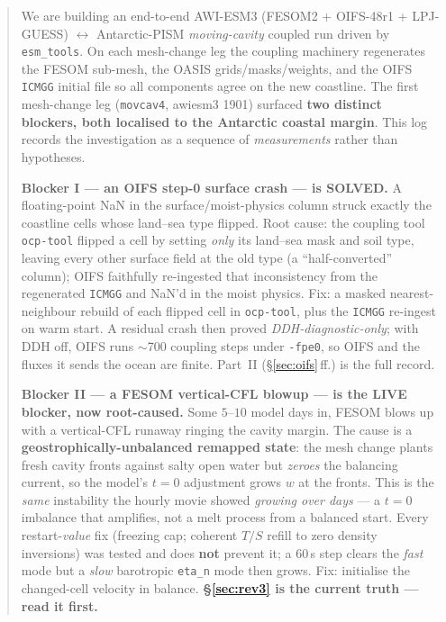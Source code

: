 \documentclass[11pt,a4paper]{article}
\newcommand{\code}[1]{\texttt{\small #1}}
\begin{document}
\begin{abstract}
\noindent
We are building an end-to-end AWI-ESM3 (FESOM2 + OIFS-48r1 + LPJ-GUESS) $\leftrightarrow$
Antarctic-PISM \emph{moving-cavity} coupled run driven by \code{esm\_tools}. On each
mesh-change leg the coupling machinery regenerates the FESOM sub-mesh, the OASIS
grids/masks/weights, and the OIFS \code{ICMGG} initial file so all components agree on the
new coastline. The first mesh-change leg (\code{movcav4}, awiesm3 1901) surfaced \textbf{two
distinct blockers, both localised to the Antarctic coastal margin}. This log records the
investigation as a sequence of \emph{measurements} rather than hypotheses.

\smallskip\noindent
\textbf{Blocker I --- an OIFS step-0 surface crash --- is SOLVED.} A floating-point NaN in
the surface/moist-physics column struck exactly the coastline cells whose land--sea type
flipped. Root cause: the coupling tool \code{ocp-tool} flipped a cell by setting \emph{only}
its land--sea mask and soil type, leaving every other surface field at the old type (a
``half-converted'' column); OIFS faithfully re-ingested that inconsistency from the
regenerated \code{ICMGG} and NaN'd in the moist physics. Fix: a masked nearest-neighbour
rebuild of each flipped cell in \code{ocp-tool}, plus the \code{ICMGG} re-ingest on warm
start. A residual crash then proved \emph{DDH-diagnostic-only}; with DDH off, OIFS runs
$\sim$700 coupling steps under \code{-fpe0}, so OIFS and the fluxes it sends the ocean are
finite. Part~II (\S\ref{sec:oifs}\,ff.) is the full record.

\smallskip\noindent
\textbf{Blocker II --- a FESOM vertical-CFL blowup --- is the LIVE blocker, now root-caused.}
Some $5$--$10$ model days in, FESOM blows up with a vertical-CFL runaway ringing the cavity
margin. The cause is a \textbf{geostrophically-unbalanced remapped state}: the mesh change plants
fresh cavity fronts against salty open water but \emph{zeroes} the balancing current, so the
model's $t=0$ adjustment grows $w$ at the fronts. This is the \emph{same} instability the hourly
movie showed \emph{growing over days} --- a $t=0$ imbalance that amplifies, not a melt process
from a balanced start. Every restart-\emph{value} fix (freezing cap; coherent $T/S$ refill to
zero density inversions) was tested and does \textbf{not} prevent it; a 60\,s step clears the
\emph{fast} mode but a \emph{slow} barotropic \code{eta\_n} mode then grows. Fix: initialise the
changed-cell velocity in balance. \textbf{\S\ref{sec:rev3} is the current truth --- read it first.}
\end{abstract}
\end{document}
